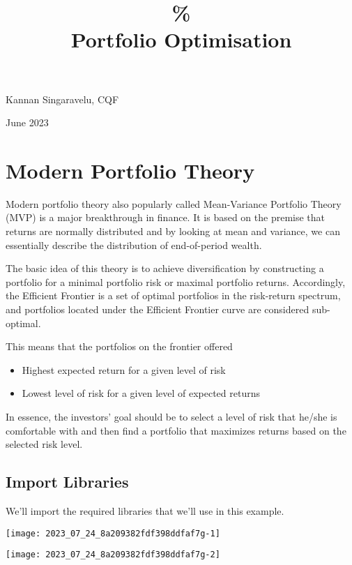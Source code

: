 \documentclass[10pt]{article}
\title{\% \\ Portfolio Optimisation }
\author{}
\date{}
\begin{document}
\maketitle
Kannan Singaravelu, CQF

June 2023

\section*{Modern Portfolio Theory}
Modern portfolio theory also popularly called Mean-Variance Portfolio Theory (MVP) is a major breakthrough in finance. It is based on the premise that returns are normally distributed and by looking at mean and variance, we can essentially describe the distribution of end-of-period wealth.

The basic idea of this theory is to achieve diversification by constructing a portfolio for a minimal portfolio risk or maximal portfolio returns. Accordingly, the Efficient Frontier is a set of optimal portfolios in the risk-return spectrum, and portfolios located under the Efficient Frontier curve are considered sub-optimal.

This means that the portfolios on the frontier offered

\begin{itemize}
  \item Highest expected return for a given level of risk

  \item Lowest level of risk for a given level of expected returns

\end{itemize}

In essence, the investors' goal should be to select a level of risk that he/she is comfortable with and then find a portfolio that maximizes returns based on the selected risk level.

\subsection*{Import Libraries}
We'll import the required libraries that we'll use in this example.

\begin{center}
\texttt{[image: 2023\_07\_24\_8a209382fdf398ddfaf7g-1]}
\end{center}

\begin{center}
\texttt{[image: 2023\_07\_24\_8a209382fdf398ddfaf7g-2]}
\end{center}
\end{document}
